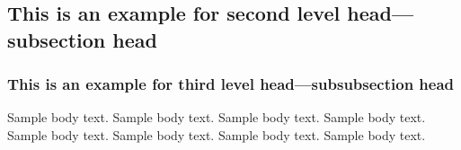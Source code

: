 \subsection{This is an example for second level head---subsection head}\label{subsec2}

\subsubsection{This is an example for third level head---subsubsection head}\label{subsubsec2}

Sample body text. 
Sample body text. 
Sample body text. 
Sample body text. 
Sample body text. 
Sample body text. 
Sample body text. 
Sample body text. 
